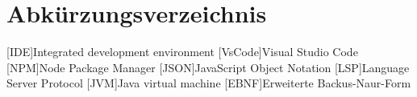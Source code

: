 \chapter*{Abkürzungsverzeichnis}

\begin{acronym}[LoRaWAN]

[IDE]{Integrated development environment}
[VsCode]{Visual Studio Code}
[NPM]{Node Package Manager}
[JSON]{JavaScript Object Notation}
[LSP]{Language Server Protocol}
[JVM]{Java virtual machine}
[EBNF]{Erweiterte Backus-Naur-Form}


\end{acronym}
